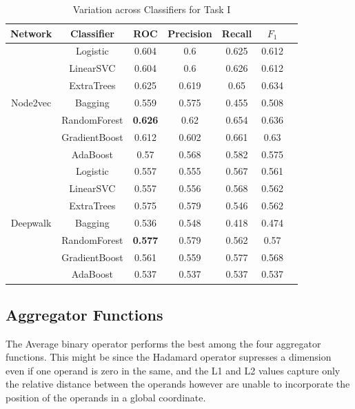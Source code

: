 \documentclass[sigconf]{acmart}
\begin{document}
\begin{table}[h]
\begin{center}
\begin{tabular}{ c|c|c|c|c|c|c } 
\textbf{Network} & \textbf{Classifier} & \textbf{ROC} & \textbf{Precision} & \textbf{Recall} & \textbf{$F_{1}$} \\ 
\hline
& Logistic & 0.604 & 0.6 & 0.625 & 0.612 \\
& LinearSVC & 0.604 & 0.6 & 0.626 & 0.612 \\
& ExtraTrees & 0.625 & 0.619 & 0.65 & 0.634 \\
Node2vec & Bagging & 0.559 & 0.575 & 0.455 & 0.508 \\
& RandomForest & \textbf{0.626} & 0.62 & 0.654 & 0.636 \\
& GradientBoost & 0.612 & 0.602 & 0.661 & 0.63 \\
& AdaBoost & 0.57 & 0.568 & 0.582 & 0.575 \\
\hline
& Logistic & 0.557 & 0.555 & 0.567 & 0.561 \\
& LinearSVC & 0.557 & 0.556 & 0.568 & 0.562 \\
& ExtraTrees & 0.575 & 0.579 & 0.546 & 0.562 \\
Deepwalk & Bagging & 0.536 & 0.548 & 0.418 & 0.474 \\
& RandomForest & \textbf{0.577} & 0.579 & 0.562 & 0.57 \\
& GradientBoost & 0.561 & 0.559 & 0.577 & 0.568 \\
& AdaBoost & 0.537 & 0.537 & 0.537 & 0.537
\end{tabular}
\end{center}
\caption{Variation across Classifiers for Task I}
\label{tab:res4.2}
\end{table}

\subsection{Aggregator Functions}
The Average binary operator performs the best among the four aggregator functions. This might be since the Hadamard operator supresses a dimension even if one operand is zero in the same, and the L1 and L2 values capture only the relative distance between the operands however are unable to incorporate the position of the operands in a global coordinate.
\end{document}
